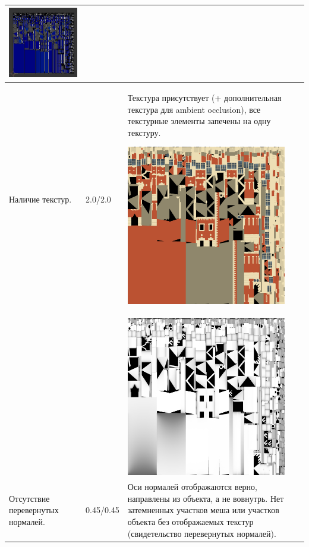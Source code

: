 \begin{longtable}{|p{4cm}|p{2.5cm}|p{7.5cm}|}
    \includegraphics[width=7cm]{src/uv_3}\\
    \hline
    Наличие текстур. & 2.0/2.0 & Текстура присутствует (+ дополнительная текстура для ambient occlusion), все текстурные элементы запечены на одну текстуру.

    \includegraphics[width=7cm]{src/tec_5}\\
    & & \includegraphics[width=7cm]{src/tec_6}\\
    \hline

    Отсутствие перевернутых нормалей. & 0.45/0.45 & Оси нормалей отображаются верно, направлены из объекта, а не вовнутрь. Нет затемненных участков меша или участков объекта без отображаемых текстур (свидетельство перевернутых нормалей).


\end{longtable}
